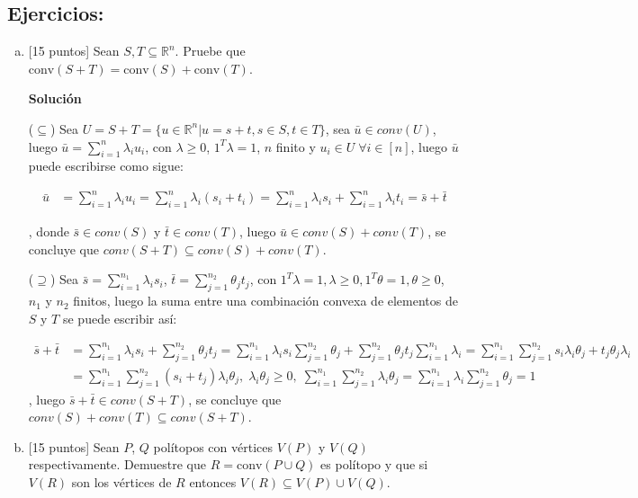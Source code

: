 \documentclass{article}
\newcommand{\RR}{\mathbb R}
\theoremstyle{plain}
\theoremstyle{definition}
\theoremstyle{Azul}
\begin{document}
\subsection*{Ejercicios:}
\begin{enumerate}[(a)]
\item {} [15 puntos] Sean $S,T\subseteq \RR^n$. Pruebe que $\text{conv}(S + T)=\text{conv}(S)+\text{conv}(T)$.

\textbf{Solución}

($\subseteq$)
Sea $U=S+T=\{u\in \mathbb{R}^{n}|u=s+t, s\in S, t\in T\}$,  sea $\bar{u}\in conv(U)$, luego $\bar{u}=\sum_{i=1}^{n}\lambda_{i}u_{i}$, con $\lambda\geq 0$, $1^{T}\lambda=1$, $n$ finito y $u_{i}\in U \; \forall i \in [n]$, luego $\bar{u}$ puede escribirse como sigue:

\begin{align*}
\bar{u} &= \sum_{i=1}^{n}\lambda_{i}u_{i} = \sum_{i=1}^{n}\lambda_{i}(s_{i}+t_{i}) = \sum_{i=1}^{n}\lambda_{i}s_{i}+\sum_{i=1}^{n}\lambda_{i}t_{i} = \bar{s}+\bar{t}
\end{align*}

, donde $\bar{s}\in conv(S)$ y $\bar{t}\in conv(T)$,  luego $\bar{u}\in conv(S)+conv(T)$, se concluye que $conv(S+T)\subseteq conv(S)+conv(T)$. 

($\supseteq$)
Sea $\bar{s}=\sum_{i=1}^{n_{1}}\lambda_{i}s_{i}$, $\bar{t}=\sum_{j=1}^{n_{2}}\theta_{j}t_{j}$, con $1^{T}\lambda=1, \lambda\geq 0, 1^{T}\theta=1, \theta\geq 0$, $n_{1}$ y $n_{2}$ finitos, luego la suma entre una combinación convexa de elementos de $S$ y $T$ se puede escribir así:

\begin{align*}
    \bar{s}+\bar{t}&=\sum_{i=1}^{n_{1}}\lambda_{i}s_{i}+\sum_{j=1}^{n_{2}}\theta_{j}t_{j}=\sum_{i=1}^{n_{1}}\lambda_{i}s_{i}\sum_{j=1}^{n_{2}}\theta_{j}+\sum_{j=1}^{n_{2}}\theta_{j}t_{j}\sum_{i=1}^{n_{1}}\lambda_{i} =\sum_{i=1}^{n_{1}}\sum_{j=1}^{n_{2}}s_{i}\lambda_{i}\theta_{j}+t_{j}\theta_{j}\lambda_{i}\\
    & =\sum_{i=1}^{n_{1}}\sum_{j=1}^{n_{2}}(s_{i}+t_{j})\lambda_{i}\theta_{j}, \; \lambda_{i}\theta_{j}\geq 0, \; \sum_{i=1}^{n_{1}}\sum_{j=1}^{n_{2}}\lambda_{i}\theta_{j}=\sum_{i=1}^{n_{1}}\lambda_{i}\sum_{j=1}^{n_{2}}\theta_{j} = 1
\end{align*}
, luego $\bar{s}+\bar{t}\in conv(S+T)$, se concluye que $conv(S)+conv(T)\subseteq conv(S+T)$.

\item {} [15 puntos] Sean $P$, $Q$ polítopos con vértices $V(P)$ y $V(Q)$ respectivamente. Demuestre que
$R=\text{conv}(P\cup Q)$ es polítopo y que si $V(R)$ son los vértices de $R$ entonces $V(R)\subseteq V(P)\cup V(Q)$.


\end{enumerate}
\end{document}
